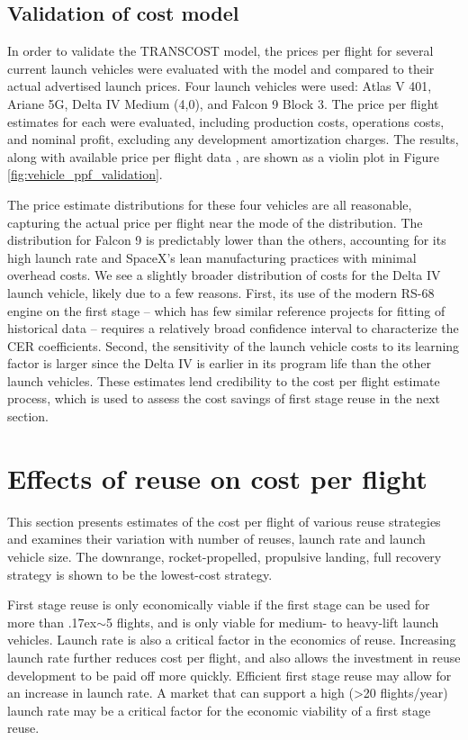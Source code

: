 \documentclass{iaf-iac}
\begin{document}
\begin{multicols}{2}
\subsection{Validation of cost model} \label{sec:validation_cost_model}
In order to validate the TRANSCOST model, the prices per flight for several current launch vehicles were evaluated with the model and compared to their actual advertised launch prices. Four launch vehicles were used: Atlas V 401, Ariane 5G, Delta IV Medium (4,0), and Falcon 9 Block 3. The price per flight estimates for each were evaluated, including production costs, operations costs, and nominal profit, excluding any development amortization charges. The results, along with available price per flight data  \cite{ULARocketBuilder, FlightGlobalArianespace, GAO2017, SpaceXCapabilities}, are shown as a violin plot in Figure \ref{fig:vehicle_ppf_validation}. 


The price estimate distributions for these four vehicles are all reasonable, capturing the actual price per flight near the mode of the distribution. The distribution for Falcon 9 is predictably lower than the others, accounting for its high launch rate and SpaceX's lean manufacturing practices with minimal overhead costs. We see a slightly broader distribution of costs for the Delta IV launch vehicle, likely due to a few reasons. First, its use of the modern RS-68 engine on the first stage -- which has few similar reference projects for fitting of historical data -- requires a relatively broad confidence interval to characterize the CER coefficients. Second, the sensitivity of the launch vehicle costs to its learning factor is larger since the Delta IV is earlier in its program life than the other launch vehicles. These estimates lend credibility to the cost per flight estimate process, which is used to assess  the cost savings of first stage reuse in the next section.

\section{Effects of reuse on cost per flight}

This section presents estimates of the cost per flight of various reuse strategies and examines their variation with number of reuses, launch rate and launch vehicle size. The downrange, rocket-propelled, propulsive landing, full recovery strategy is shown to be the lowest-cost strategy.

First stage reuse is only economically viable if the first stage can be used for more than {\raise.17ex\hbox{$\scriptstyle\sim$}}5 flights, and is only viable for medium- to heavy-lift launch vehicles. Launch rate is also a critical factor in the economics of reuse. Increasing launch rate further reduces cost per flight, and also allows the investment in reuse development to be paid off more quickly. Efficient first stage reuse may allow for an increase in launch rate. A market that can support a high (>20 flights/year) launch rate may be a critical factor for the economic viability of a first stage reuse.


\end{multicols}
\end{document}
